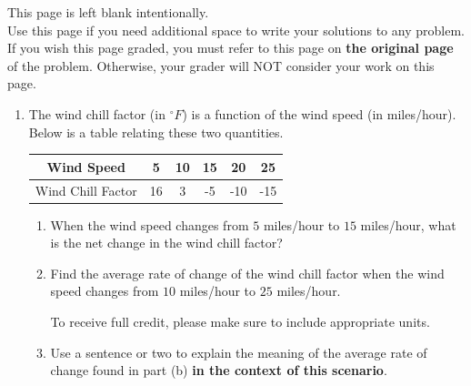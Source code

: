 \documentclass[11pt]{article}
\begin{document}
\vfill


\newpage

This page is left blank intentionally.\\

Use this page if you need additional space to write your solutions to any problem. \\

If you wish this page graded, you must refer to this page on \textbf{the original page} of the problem. Otherwise, your grader will NOT consider your work on this page.

\newpage%


\begin{enumerate}


\item The wind chill factor (in $^\circ F$) is a function of the wind speed (in miles/hour). Below is a table relating these two quantities.

    \begin{table}[h!]
        \centering
        \begin{tabular}{c|ccccc}
            \hline
           Wind Speed  & 5 & 10 & 15 & 20 & 25 \\
           \hline
           Wind Chill Factor & 16 & 3 & -5 & -10 & -15\\
           \hline
        \end{tabular}
    \end{table}

\begin{enumerate}
    \item When the wind speed changes from $5$ miles/hour to $15$ miles/hour, what is the net change in the wind chill factor?

    \vfill

    \item  Find the average rate of change of the wind chill factor when the wind speed changes from $10$ miles/hour to $25$ miles/hour.
    
    To receive full credit, please make sure to include appropriate units.

    \vfill
    \vfill

    \item Use a sentence or two to explain the meaning of the average rate of change found in part (b) \textbf{in the context of this scenario}. 


\end{enumerate}
\end{enumerate}
\end{document}
